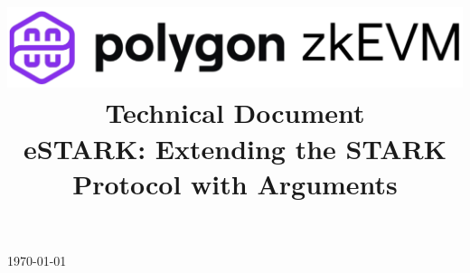 \documentclass[preprint]{iacrtrans}
\title{
	\includegraphics[width=\columnwidth]{logo_zkEVM.png} 	\\ \vspace{0.3cm}
	Technical Document 										\\ \vspace{0.3cm}
	eSTARK: Extending the STARK Protocol with Arguments		\\ \vspace{0.3cm}
	\version
}
\institute{}
\theoremstyle{definition}
\begin{document}
\maketitle

\begin{center}
	\vspace{-5mm}
	\today
\end{center}


%
%
{\hypersetup{linkcolor=.}\tableofcontents}

\newpage






\newpage



\newpage
\appendix



\newpage

\end{document}
